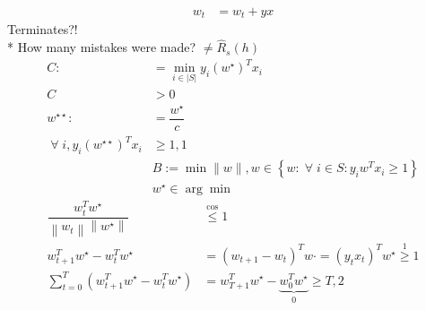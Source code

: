 \documentclass{article}
\begin{document}
\begin{align*}
w_{t} &= w_{t} + y x 
\end{align*}
Terminates?$!$
\\* How many mistakes were made? $\neq  \hat{R}_{s}\left(h\right)$
\newline \newline
\begin{align*}
C  :&= \displaystyle\min_{i \in | S |} y_{i} \left(w^\star \right)^{T} x_{i}
\\ C  &> 0
\\ w^{\star\star} :&= \dfrac{w^\star }{c}
\\ \;\forall\; i, y_{i} \left(w^{\star\star}\right)^{T} x_{i} &\geq  1, \boxed{1}
\\ &  \boxed{B:= \displaystyle\min \| w \|, w \in \left\{w : \;\forall\; i \in S: y_{i} w^{T} x_{i} \geq  1\right\}}
\\ &  \boxed{w^\star  \in \arg\displaystyle\min}
\end{align*}
\begin{align*}
\dfrac{w_{t}^{T} w^\star }{\left\|w_{t}\right\| \left\|w^\star \right\|} &\stackrel{\cos}{\leq} 1
\\ w_{t+1}^{T} w^\star  - w_{t}^{T} w^\star  &= \left(w_{t+1} - w_{t}\right)^{T} w\cdot  = \left(y_{t} x_{t}\right)^{T} w^\star  \stackrel{\boxed{1}}{\geq} 1
\\ \displaystyle\sum_{t=0}^{T} \left(w_{t+1}^{T} w^\star  - w_{t}^{T} w^\star \right) &= w_{T+1}^{T} w^\star  - \underbrace{w_{0}^{T} w^\star }_{0} \geq  T , \boxed{2}
\end{align*}
\end{document}
